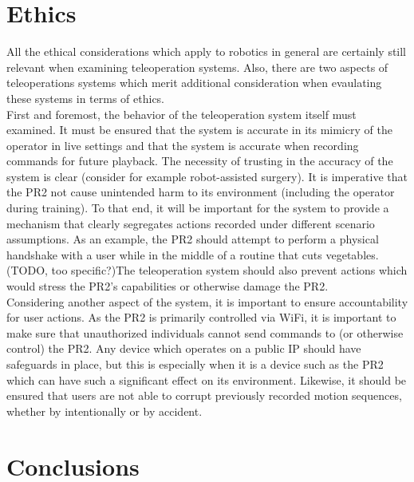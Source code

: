 \documentclass{sig-alternate}
\begin{document}
\section{Ethics}
\label{sec:ethics}All the ethical considerations which apply to robotics in 
general are certainly still relevant when examining teleoperation systems.
Also, there are two aspects of teleoperations systems which merit additional
consideration when evaulating these systems in terms of ethics. \\
\indent First and foremost, the behavior of the teleoperation system itself 
must examined. It must be ensured that the system is accurate in its mimicry
of the operator in live settings and that the system is accurate when
recording commands for future playback. The necessity of trusting in the
accuracy of the system is clear (consider for example robot-assisted surgery).
It is imperative that the PR2 not cause unintended harm to its environment
(including the operator during training). To that end, it will be important
for the system to provide a mechanism that clearly segregates actions recorded 
under different scenario assumptions. As an example, the PR2 should attempt to 
perform a physical handshake with a user while  in the middle of a routine
that cuts vegetables. (TODO, too specific?)The teleoperation system should also
prevent actions which would stress the PR2's capabilities or otherwise
damage the PR2.\\
\indent Considering another aspect of the system, it is important to ensure
accountability 
for user actions. As the PR2 is primarily controlled via WiFi, it is important
to make sure that unauthorized individuals cannot send commands to (or 
otherwise control) the PR2. Any device which operates on a public IP should 
have safeguards in place, but this is especially when it is a device such as
the PR2 which can have such a significant effect on its environment.
Likewise, it should be ensured that users are
not able to corrupt previously recorded motion sequences, whether by 
intentionally or by accident.
\section{Conclusions}
\label{sec:conclusions}

\end{document}
